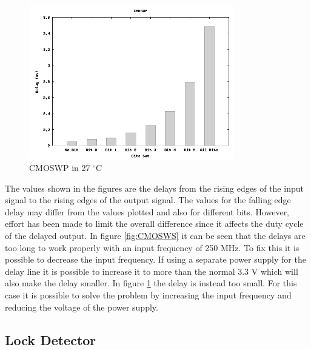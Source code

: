 \documentclass[a4paper,12pt]{article} \usepackage{graphicx}
\newcommand{\degree}{\ensuremath{^\circ}}
\begin{document}
\begin{figure}[h!]
        \centering
        \includegraphics[width=0.8\textwidth]{../Bilder/Delay_Line/CMOSWP.png}
        \caption{CMOSWP in 27 \degree C}
        \label{fig:CMOSWP}
\end{figure}

The values shown in the figures are the
delays from the rising edges of the input signal to the rising edges of the
output signal. The values for the falling edge delay may differ from the values
plotted and also for different bits. However, effort has been made to limit the
overall difference since it affects the duty cycle of the delayed output. 
In figure \ref{fig:CMOSWS} it can be seen that the delays are too long to work
properly with an input frequency of 250 MHz. To fix this it is possible to
decrease the input frequency. If using a separate power supply for the delay
line it is possible to increase it to more than the normal 3.3 V which will
also make the delay smaller. In figure \ref{fig:CMOSWP} the delay is instead too
small. For this case it is possible to solve the problem by increasing the input
frequency and reducing the voltage of the power supply.


\subsection{Lock Detector}
\end{document}
